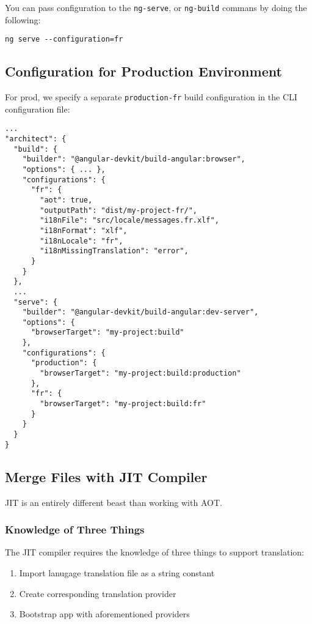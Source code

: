 You can pass configuration to the \lstinline{ng-serve}, or \lstinline{ng-build}
commans by doing the following: 
\begin{verbatim}
ng serve --configuration=fr
\end{verbatim}

\subsection{Configuration for Production Environment}
For prod, we specify a separate \lstinline{production-fr} build configuration 
in the CLI configuration file: 
\begin{lstlisting}[caption=angular.json]
...
"architect": {
  "build": {
    "builder": "@angular-devkit/build-angular:browser",
    "options": { ... },
    "configurations": {
      "fr": {
        "aot": true,
        "outputPath": "dist/my-project-fr/",
        "i18nFile": "src/locale/messages.fr.xlf",
        "i18nFormat": "xlf",
        "i18nLocale": "fr",
        "i18nMissingTranslation": "error",
      }
    }
  },
  ...
  "serve": {
    "builder": "@angular-devkit/build-angular:dev-server",
    "options": {
      "browserTarget": "my-project:build"
    },
    "configurations": {
      "production": {
        "browserTarget": "my-project:build:production"
      },
      "fr": {
        "browserTarget": "my-project:build:fr"
      }
    }
  }
}  
\end{lstlisting}

\subsection{Merge Files with JIT Compiler}
JIT is an entirely different beast than working with AOT. 


\subsubsection{ Knowledge of Three Things }
The JIT compiler requires the knowledge of three things to support translation: 
\begin{enumerate}
  \item Import lanugage translation file as a string constant
  \item Create corresponding translation provider
  \item Bootstrap app with aforementioned providers
\end{enumerate}


